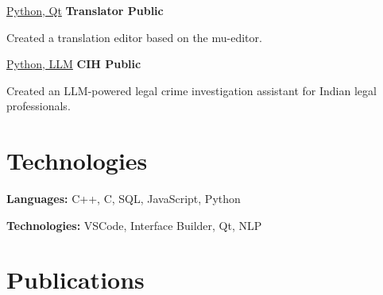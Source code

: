 \documentclass[10pt, A4]{article}
\begin{document}
	\begin{twocolentry}{
			\href{https://github.com/mu-editor/mu}{Python, Qt}
		}
		\textbf{Translator Public}
		\begin{highlights}
			\item Created a translation editor based on the mu-editor.
		\end{highlights}
	\end{twocolentry}
	
	\vspace{0.1 cm}
	
	\begin{twocolentry}{
			\href{https://github.com/OJasSharma24/Crime-Investigation-Helper}{Python, LLM}
		}
		\textbf{CIH Public} 
		\begin{highlights}
			\item Created an LLM-powered legal crime investigation assistant for Indian legal professionals.
		\end{highlights}
	\end{twocolentry}
	
	\section{Technologies}
	
	\begin{onecolentry}
		\textbf{Languages:} C++, C, SQL, JavaScript, Python
	\end{onecolentry}
	
	\vspace{0.2 cm}
	
	\begin{onecolentry}
		\textbf{Technologies:} VSCode, Interface Builder, Qt, NLP
	\end{onecolentry}

	\section{Publications}
	
\end{document}
